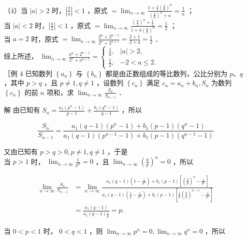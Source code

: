 \documentclass[10pt]{article}
\begin{document}
（4）当 \(|a|>2\) 时，\(\left|\frac{2}{a}\right|<1\) ，原式 \(=\lim _{n \rightarrow \infty} \frac{1+\frac{1}{2}\left(\frac{2}{a}\right)^{n}}{\left(\frac{2}{a}\right)^{n}+a}=\frac{1}{a}\) ；\\
当 \(|a|<2\) 时，\(\left|\frac{a}{2}\right|<1\) ，原式 \(=\lim _{n \rightarrow \infty} \frac{\left(\frac{a}{2}\right)^{n}+\frac{1}{2}}{1+a\left(\frac{a}{2}\right)^{n}}=\frac{1}{2}\) ；\\
当 \(a=2\) 时，原式 \(=\lim _{n \rightarrow \infty} \frac{2^{n}+2^{n-1}}{2^{n}+2^{n+1}}=\frac{2+1}{2+4}=\frac{1}{2}\) ．\\
综上所述， \(\lim _{n \rightarrow \infty} \frac{a^{n}+2^{n-1}}{2^{n}+a^{n+1}}= \begin{cases}\frac{1}{a}, & |a|>2, \\ \frac{1}{2}, & -2<a \leqslant 2 .\end{cases}\)\\
［例 4 已知数列 \(\left\{a_{n}\right\}\) 与 \(\left\{b_{n}\right\}\) 都是由正数组成的等比数列，公比分别为 \(p 、 q\) ，其中 \(p>q\) ，且 \(p \neq 1, q \neq 1\) ，设数列 \(\left\{c_{n}\right\}\) 满足 \(c_{n}=a_{n}+b_{n}, S_{n}\) 为数列 \(\left\{c_{n}\right\}\) 的前 \(n\) 项和，求 \(\lim _{n \rightarrow \infty} \frac{S_{n}}{S_{n-1}}\) ．

解 由已知有 \(S_{n}=\frac{a_{1}\left(p^{n}-1\right)}{p-1}+\frac{b_{1}\left(q^{n}-1\right)}{q-1}\) ，所以

\[
\frac{S_{n}}{S_{n-1}}=\frac{a_{1}(q-1)\left(p^{n}-1\right)+b_{1}(p-1)\left(q^{n}-1\right)}{a_{1}(q-1)\left(p^{n-1}-1\right)+b_{1}(p-1)\left(q^{n-1}-1\right)}
\]

又由已知有 \(p>q>0, p \neq 1, q \neq 1\) ，于是\\
当 \(p>1\) 时， \(\lim _{n \rightarrow \infty} \frac{1}{p^{n}}=0\) ，且 \(\lim _{n \rightarrow \infty}\left(\frac{q}{p}\right)^{n}=0\) ，所以

\[
\begin{aligned}
\lim _{n \rightarrow \infty} \frac{S_{n}}{S_{n-1}} & =\lim _{n \rightarrow \infty} \frac{a_{1}(q-1)\left(1-\frac{1}{p^{n}}\right)+b_{1}(p-1)\left[\left(\frac{q}{p}\right)^{n}-\frac{1}{p^{n}}\right]}{a_{1}(q-1)\left(\frac{1}{p}-\frac{1}{p^{n}}\right)+b_{1}(p-1)\left[\frac{1}{p}\left(\frac{q}{p}\right)^{n-1}-\frac{1}{p^{n}}\right]} \\
& =\frac{a_{1}(q-1)}{a_{1}(q-1) \frac{1}{p}}=p .
\end{aligned}
\]

当 \(0<p<1\) 时， \(0<q<1\) ，则 \(\lim _{n \rightarrow \infty} p^{n}=0, \lim _{n \rightarrow \infty} q^{n}=0\) ，所以
\end{document}

